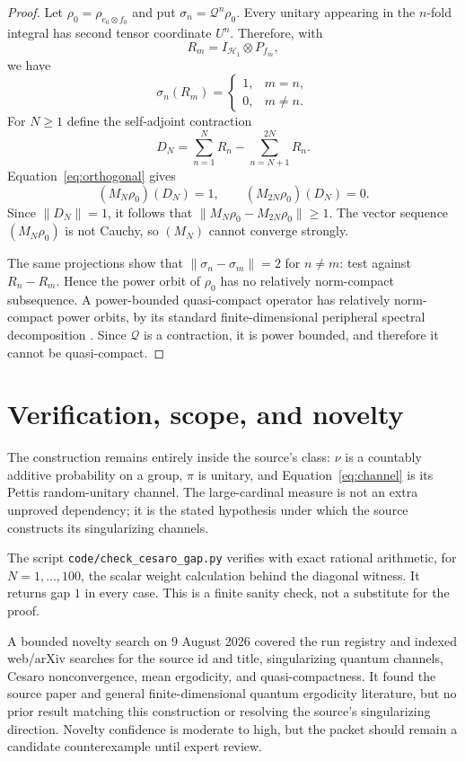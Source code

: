 \documentclass[11pt]{article}
\newcommand{\Q}{\mathcal Q}
\begin{document}
\begin{proof}
Let $\rho_0=\rho_{e_0\otimes f_0}$ and put
$\sigma_n=\Q^n\rho_0$. Every unitary appearing in the $n$-fold integral has
second tensor coordinate $U^n$. Therefore, with
\[
 R_m=I_{\mathcal H_1}\otimes P_{f_m},
\]
we have
\begin{equation}\label{eq:orthogonal}
 \sigma_n(R_m)=\begin{cases}1,&m=n,\\0,&m\neq n.\end{cases}
\end{equation}
For $N\geq1$ define the self-adjoint contraction
\[
 D_N=\sum_{n=1}^N R_n-\sum_{n=N+1}^{2N}R_n.
\]
Equation~\eqref{eq:orthogonal} gives
\[
 (M_N\rho_0)(D_N)=1,
 \qquad
 (M_{2N}\rho_0)(D_N)=0.
\]
Since $\|D_N\|=1$, it follows that
$\|M_N\rho_0-M_{2N}\rho_0\|\geq1$. The vector sequence
$(M_N\rho_0)$ is not Cauchy, so $(M_N)$ cannot converge strongly.

The same projections show that $\|\sigma_n-\sigma_m\|=2$ for $n\neq m$:
test against $R_n-R_m$. Hence the power orbit of $\rho_0$ has no relatively
norm-compact subsequence. A power-bounded quasi-compact operator has relatively
norm-compact power orbits, by its standard finite-dimensional peripheral
spectral decomposition \cite[Uniform ergodic theory]{DS}. Since $\Q$ is a
contraction, it is power bounded, and therefore it cannot be quasi-compact.
\end{proof}

\section{Verification, scope, and novelty}

The construction remains entirely inside the source's class: $\nu$ is a
countably additive probability on a group, $\pi$ is unitary, and
Equation~\eqref{eq:channel} is its Pettis random-unitary channel. The
large-cardinal measure is not an extra unproved dependency; it is the stated
hypothesis under which the source constructs its singularizing channels.

The script \texttt{code/check\_cesaro\_gap.py} verifies with exact rational
arithmetic, for $N=1,\ldots,100$, the scalar weight calculation behind the
diagonal witness. It returns gap $1$ in every case. This is a finite sanity
check, not a substitute for the proof.

A bounded novelty search on 9 August 2026 covered the run registry and indexed
web/arXiv searches for the source id and title, singularizing quantum channels,
Cesaro nonconvergence, mean ergodicity, and quasi-compactness. It found the
source paper and general finite-dimensional quantum ergodicity literature,
but no prior result matching this construction or resolving the source's
singularizing direction. Novelty confidence is moderate to high, but the
packet should remain a candidate counterexample until expert review.
\end{document}
